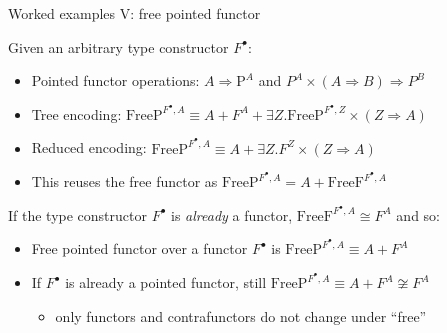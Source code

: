 \documentclass[english,,russian]{beamer}
\begin{document}
\begin{frame}{Worked examples V: free pointed functor}

Given an arbitrary type constructor $F^{\bullet}$:
\begin{itemize}
\item Pointed functor operations: $A\Rightarrow\text{P}^{A}$ and $P^{A}\times\left(A\Rightarrow B\right)\Rightarrow P^{B}$
\item Tree encoding: $\text{FreeP}^{F^{\bullet},A}\equiv A+F^{A}+\exists Z.\text{FreeP}^{F^{\bullet},Z}\times\left(Z\Rightarrow A\right)$
\item Reduced encoding: $\text{FreeP}^{F^{\bullet},A}\equiv A+\exists Z.F^{Z}\times\left(Z\Rightarrow A\right)$
\item This reuses the free functor as $\text{FreeP}^{F^{\bullet},A}=A+\text{FreeF}^{F^{\bullet},A}$
\end{itemize}
If the type constructor $F^{\bullet}$ is \emph{already} a functor,
$\text{FreeF}^{F^{\bullet},A}\cong F^{A}$ and so:
\begin{itemize}
\item Free pointed functor over a functor $F^{\bullet}$ is $\text{FreeP}^{F^{\bullet},A}\equiv A+F^{A}$
\item If $F^{\bullet}$ is already a pointed functor, still $\text{FreeP}^{F^{\bullet},A}\equiv A+F^{A}\not\cong F^{A}$ 
\begin{itemize}
\item only functors and contrafunctors do not change under ``free''
\end{itemize}
\end{itemize}
\end{frame}
\end{document}
